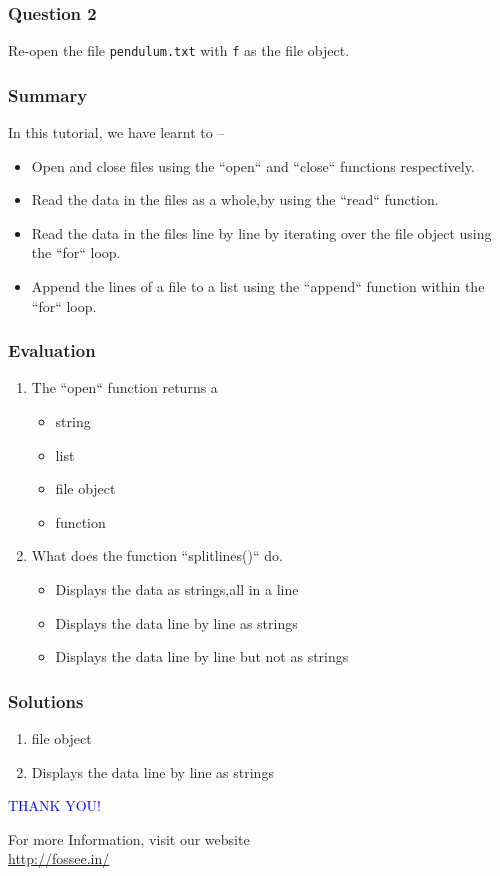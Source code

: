 \documentclass[presentation]{beamer}
\begin{document}
\begin{frame}
\frametitle{Question 2}
\label{sec-4}

  Re-open the file \texttt{pendulum.txt} with \texttt{f} as the file object.
\end{frame}
\begin{frame}
\frametitle{Summary}
\label{sec-5}

  In this tutorial, we have learnt to –

\begin{itemize}
\item Open and close files using the ``open`` and ``close`` functions respectively.
\item Read the data in the files as a whole,by using the ``read`` function.
\item Read the data in the files line by line by iterating over the file object
    using the ``for`` loop.
\item Append the lines of a file to a list using the ``append`` function within
    the  ``for`` loop.
\end{itemize}
\end{frame}
\begin{frame}
\frametitle{Evaluation}
\label{sec-6}


\begin{enumerate}
\item The ``open`` function returns a
\begin{itemize}
\item string
\item list
\item file object
\item function
\end{itemize}
\item What does the function ``splitlines()`` do.
\begin{itemize}
\item Displays the data as strings,all in a line
\item Displays the data line by line as strings
\item Displays the data line by line but not as strings
\end{itemize}
\end{enumerate}
\end{frame}
\begin{frame}
\frametitle{Solutions}
\label{sec-7}


\begin{enumerate}
\item file object
\item Displays the data line by line as strings
\end{enumerate}
\end{frame}
\begin{frame}

  \begin{block}{}
  \begin{center}
  \textcolor{blue}{\Large THANK YOU!} 
  \end{center}
  \end{block}
\begin{block}{}
  \begin{center}
    For more Information, visit our website\\
    \url{http://fossee.in/}
  \end{center}  
  \end{block}
\end{frame}
\end{document}
